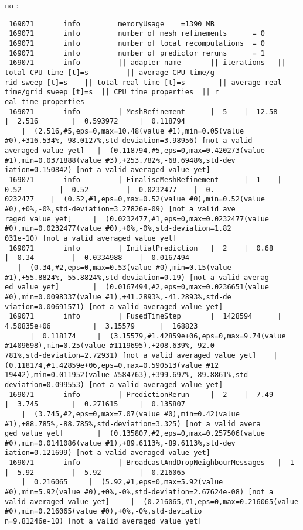 no \amr{}:
\begin{verbatim}
 169071       info         memoryUsage    =1390 MB
 169071       info         number of mesh refinements      = 0
 169071       info         number of local recomputations  = 0
 169071       info         number of predictor reruns      = 1
 169071       info         || adapter name       || iterations   || total CPU time [t]=s         || average CPU time/g
rid sweep [t]=s    || total real time [t]=s        || average real time/grid sweep [t]=s  || CPU time properties  || r
eal time properties 
 169071       info         | MeshRefinement      |  5    |  12.58        |  2.516        |  0.593972     |  0.118794 
    |  (2.516,#5,eps=0,max=10.48(value #1),min=0.05(value #0),+316.534%,-98.0127%,std-deviation=3.98956) [not a valid 
averaged value yet]   |  (0.118794,#5,eps=0,max=0.420273(value #1),min=0.0371888(value #3),+253.782%,-68.6948%,std-dev
iation=0.150842) [not a valid averaged value yet]
 169071       info         | FinaliseMeshRefinement      |  1    |  0.52         |  0.52         |  0.0232477    |  0.
0232477    |  (0.52,#1,eps=0,max=0.52(value #0),min=0.52(value #0),+0%,-0%,std-deviation=3.27826e-09) [not a valid ave
raged value yet]     |  (0.0232477,#1,eps=0,max=0.0232477(value #0),min=0.0232477(value #0),+0%,-0%,std-deviation=1.82
031e-10) [not a valid averaged value yet]
 169071       info         | InitialPrediction   |  2    |  0.68         |  0.34         |  0.0334988    |  0.0167494 
   |  (0.34,#2,eps=0,max=0.53(value #0),min=0.15(value #1),+55.8824%,-55.8824%,std-deviation=0.19) [not a valid averag
ed value yet]        |  (0.0167494,#2,eps=0,max=0.0236651(value #0),min=0.0098337(value #1),+41.2893%,-41.2893%,std-de
viation=0.00691571) [not a valid averaged value yet]
 169071       info         | FusedTimeStep       |  1428594      |  4.50835e+06          |  3.15579      |  168823 
      |  0.118174     |  (3.15579,#1.42859e+06,eps=0,max=9.74(value #1409698),min=0.25(value #1119695),+208.639%,-92.0
781%,std-deviation=2.72931) [not a valid averaged value yet]    |  (0.118174,#1.42859e+06,eps=0,max=0.590513(value #12
19442),min=0.011952(value #584763),+399.697%,-89.8861%,std-deviation=0.099553) [not a valid averaged value yet]
 169071       info         | PredictionRerun     |  2    |  7.49         |  3.745        |  0.271615     |  0.135807 
    |  (3.745,#2,eps=0,max=7.07(value #0),min=0.42(value #1),+88.785%,-88.785%,std-deviation=3.325) [not a valid avera
ged value yet]        |  (0.135807,#2,eps=0,max=0.257506(value #0),min=0.0141086(value #1),+89.6113%,-89.6113%,std-dev
iation=0.121699) [not a valid averaged value yet]
 169071       info         | BroadcastAndDropNeighbourMessages   |  1    |  5.92         |  5.92         |  0.216065 
    |  0.216065     |  (5.92,#1,eps=0,max=5.92(value #0),min=5.92(value #0),+0%,-0%,std-deviation=2.67624e-08) [not a 
valid averaged value yet]     |  (0.216065,#1,eps=0,max=0.216065(value #0),min=0.216065(value #0),+0%,-0%,std-deviatio
n=9.81246e-10) [not a valid averaged value yet]
\end{verbatim}

